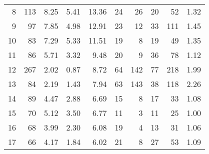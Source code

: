 \begin{tabular}{rrrrrrrrrr}
 8 &      113 &                             8.25 &                             5.41 &                            13.36 &              24 &              26 &                                 20 &                              52 &       1.32 \\
 9 &       97 &                             7.85 &                             4.98 &                            12.91 &              23 &              12 &                                 33 &                             111 &       1.45 \\
10 &       83 &                             7.29 &                             5.33 &                            11.51 &              19 &               8 &                                 19 &                              49 &       1.35 \\
11 &       86 &                             5.71 &                             3.32 &                             9.48 &              20 &               9 &                                 36 &                              78 &       1.12 \\
12 &      267 &                             2.02 &                             0.87 &                             8.72 &              64 &             142 &                                 77 &                             218 &       1.99 \\
13 &       84 &                             2.19 &                             1.43 &                             7.94 &              63 &             143 &                                 38 &                             118 &       2.26 \\
14 &       89 &                             4.47 &                             2.88 &                             6.69 &              15 &               8 &                                 17 &                              33 &       1.08 \\
15 &       70 &                             5.12 &                             3.50 &                             6.77 &              11 &               3 &                                 11 &                              25 &       1.00 \\
16 &       68 &                             3.99 &                             2.30 &                             6.08 &              19 &               4 &                                 13 &                              31 &       1.06 \\
17 &       66 &                             4.17 &                             1.84 &                             6.02 &              21 &               8 &                                 27 &                              53 &       1.09 \\

\end{tabular}

